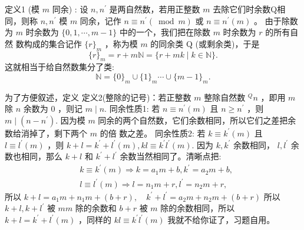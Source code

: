 

定义1 (模 $m$ 同余) : 设 $n, n^{\prime}$ 是两自然数，若用正整数 $m$ 去除它们时余数Q相同，则称 $n, n^{\prime}$ 模 $m$ 同余，记作 $n \equiv n^{\prime}(\bmod m)$ 或 $n \equiv n^{\prime}(m)$ 。
由于除数为 $m$ 时余数为 $\{0,1, \cdots, m-1\}$ 中的一个，我们把在除数 $m$ 时余数为 $r$ 的所有自然 数构成的集合记作 $\{r\}_m$ ，称为模 $m$ 的同余类 $\mathrm{Q}$ (或剩余类)，于是
\begin{equation}
\{r\}_m=r+m \mathbb{N}=\{r+m k \mid k \in \mathbb{N}\}.
\end{equation}
这就相当于给自然数集分了类:
\begin{equation}
\mathbb{N}=\{0\}_m \cup\{1\}_m \cdots \cup\{m-1\}_m.
\end{equation}

为了方便叙述，定义
定义2(整除的记号)：若正整数 $m$ 整除自然数 ${ }^Q n$ ，即用 $m$ 除 $n$ 余数为 0 ，则记 $m \mid n$.
同余性质1: 若 $n \equiv n^{\prime}(m)$ 且 $n \geq n^{\prime}$ ，则 $m \mid\left(n-n^{\prime}\right)$.
因为模 $m$ 同余的两个自然数，它们余数相同，所以它们之差把余数给消掉了，剩下两个 $m$ 的倍 数之差。
同余性质2: 若 $k \equiv k^{\prime}(m)$ 且 $l \equiv l^{\prime}(m)$ ，则 $k+l=k^{\prime}+l^{\prime}(m), k l \equiv k^{\prime} l^{\prime}(m)$.
因为 $k, k^{\prime}$ 余数相同， $l, l^{\prime}$ 余数也相同，那么 $k+l$ 和 $k^{\prime}+l^{\prime}$ 余数当然相同了。清晰点把:
\begin{equation}
\begin{aligned}
& k \equiv k^{\prime}(m) \Rightarrow k=a_1 m+b, k^{\prime}=a_2 m+b, \\
& l \equiv l^{\prime}(m) \Rightarrow l=n_1 m+r, l^{\prime}=n_2 m+r,
\end{aligned}
\end{equation}
所以 $k+l=a_1 m+n_1 m+(b+r), \quad k^{\prime}+l^{\prime}=a_2 m+n_2 m+(b+r)$
所以 $k+l, k+l^{\prime}$ 被 $m m$ 除的余数和 $b+r$ 被 $m$ 除的余数相同，所以 $k+l=k^{\prime}+l^{\prime}(m)$
，同样的 $k l \equiv k^{\prime} l^{\prime}(m)$ 我就不给你证了，习题自用。